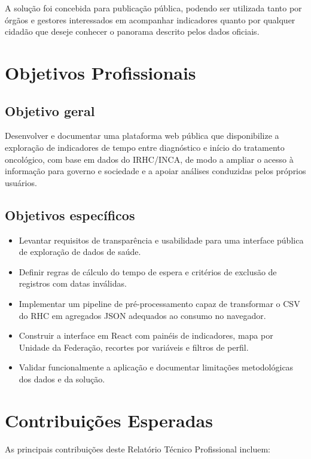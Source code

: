 A solução foi concebida para publicação pública, podendo ser utilizada tanto por órgãos e gestores interessados em acompanhar indicadores quanto por qualquer cidadão que deseje conhecer o panorama descrito pelos dados oficiais.

\section{Objetivos Profissionais}

\subsection{Objetivo geral}

Desenvolver e documentar uma plataforma web pública que disponibilize a exploração de indicadores de tempo entre diagnóstico e início do tratamento oncológico, com base em dados do \acs{IRHC}/\acs{INCA}, de modo a ampliar o acesso à informação para governo e sociedade e a apoiar análises conduzidas pelos próprios usuários.

\subsection{Objetivos específicos}

\begin{itemize}
	\item Levantar requisitos de transparência e usabilidade para uma interface pública de exploração de dados de saúde.
	\item Definir regras de cálculo do tempo de espera e critérios de exclusão de registros com datas inválidas.
	\item Implementar um pipeline de pré-processamento capaz de transformar o \acs{CSV} do \acs{RHC} em agregados \acs{JSON} adequados ao consumo no navegador.
	\item Construir a interface em React com painéis de indicadores, mapa por Unidade da Federação, recortes por variáveis e filtros de perfil.
	\item Validar funcionalmente a aplicação e documentar limitações metodológicas dos dados e da solução.
\end{itemize}

\section{Contribuições Esperadas}

As principais contribuições deste Relatório Técnico Profissional incluem:

